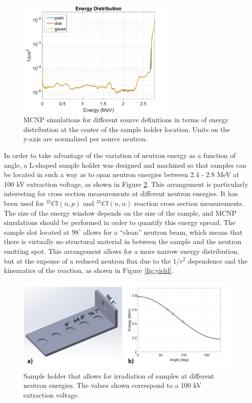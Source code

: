 \documentclass[review]{elsarticle}
\begin{document}
\begin{figure}
	\centering
	\includegraphics[width=0.7\textwidth]{pics/comp_sources_log}
	\caption{MCNP simulations for different source definitions in terms of energy distribution at the center of the sample holder location. Units on the y-axis are normalized per source neutron.}
	\label{fig:source_definitions}
\end{figure}

In order to take advantage of the variation of neutron energy as a function of angle, a L-shaped sample holder was designed and machined so that samples can be located in such a way as to span neutron energies between 2.4 - 2.8 MeV at 100 kV extraction voltage, as shown in Figure \ref{fig:L_holder}. This arrangement is particularly interesting for cross section measurements at different neutron energies. It has been used for $^{35}Cl(n,p)$ and $^{35}Cl(n,\alpha)$ reaction cross section measurements. The size of the energy window depends on the size of the sample, and MCNP simulations should be performed in order to quantify this energy spread. The sample slot located at $98^{\circ}$ allows for a ``clean'' neutron beam, which means that there is virtually no structural material in between the sample and the neutron emitting spot. This arrangement allows for a more narrow energy distribution, but at the expense of a reduced neutron flux due to the $1/r^2$ dependence and the kinematics of the reaction, as shown in Figure \ref{fig:yield}. 

\begin{figure}
	\centering
	\includegraphics[width=1\textwidth]{pics/L_holder_ang2}
	\caption{Sample holder that allows for irradiation of samples at different neutron energies. The values shown correspond to a 100 kV extraction voltage.}
	\label{fig:L_holder}
\end{figure}
	
\end{document}

